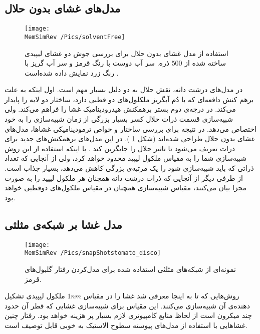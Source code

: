 \subsection{
 مدل‌های غشای بدون حلال
 }
 \begin{figure}[h]
\begin{center}
\texttt{[image: \\MemSimRev /Pics/solventFree]}
\caption{
استفاده از مدل‌ غشای بدون حلال برای بررسی جوش دو غشای لیپیدی ساخته شده از
$500$
ذره. سر آب دوست با رنگ قرمز و سر آب گریز با رنگ زرد نمایش داده شده‌است 
\cite{Noguchi2001}.
}
\label{fig:solventFree}
\end{center}
\end{figure}

 در مدل‌های درشت دانه، نقش حلال به دو دلیل بسیار مهم است. اول اینکه به علت برهم کنش دافعه‌ای که با دُم آبگریز ملکلول‌های دو قطبی دارد، ساختار دو لایه را پایدار می‌کند. در درجه‌ی دوم بستر برهمکنش هیدرودینامیک غشا را فراهم می‌کند. ولی شبیه‌سازی قسمت ذرات حلال کسر بسیار بزرگی از زمان شبیه‌سازی را به خود اختصاص می‌دهد. در نتیجه برای بررسی ساختار و خواص ترمودینامیکی غشاها، مدل‌های غشای بدون حلال
 طراحی شده‌اند (شکل
 \ref{fig:solventFree}
 ). در این مدل‌های برهمکنش‌های جدید برای ذرات تعریف می‌شود تا تاثیر حلال را جایگزین کند
 \cite{Noguchi2001, Noguchi2001PRE, Brannigan2003, Cooke2005}
 . با اینکه استفاده از این روش شبیه‌سازی شما را به مقیاس ملکول لیپید محدود خواهد کرد، ولی از آنجایی که تعداد ذراتی که باید شبیه‌سازی شود را یک مرتبه‌ی بزرگی کاهش می‌دهد، بسیار جذاب است. از طرفی دیگر از آنجایی که  ذرات درشت دانه همچنان هر ملکول لیپید را به صورت مجزا بیان می‌کنند، مقیاس شبیه‌سازی همچنان در مقیاس ملکول‌های دوقطبی خواهد بود.

\subsection{
 مدل غشا بر شبکه‌ی مثلثی
 }
  \begin{figure}[h]
\begin{center}
\texttt{[image: \\MemSimRev /Pics/snapShotstomato\_disco]}
\caption{
نمونه‌ای از شبکه‌های مثلثی استفاده شده برای مدل‌کردن رفتار گلبول‌های قرمز.
}
\label{fig:RBCmeshRep}
\end{center}
\end{figure}
 
روش‌هایی که تا به اینجا معرفی شد غشا را در مقیاس 
$1nm$
ملکول لیپیدی تشکیل دهنده‌ی آن شبیه‌سازی می‌کنند. این مقیاس برای شبیه‌سازی غشایی که قطر آن حدود چند میکرون است از لحاظ منابع کامپیوتری لازم بسیار پر هزینه خواهد بود. رفتار چنین غشا‌هایی با استفاده از مدل‌های پیوسته سطوح الاستیک به خوبی قابل توصیف است. 

